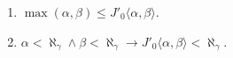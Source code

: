 \begin{enumerate}
\item $\max(\alpha, \beta) \leq J'_0 \langle \alpha, \beta \rangle$.
\item $\alpha < \aleph_\gamma \land \beta < \aleph_\gamma \rightarrow J'_0 \langle \alpha, \beta \rangle < \aleph_\gamma$.
\end{enumerate}
